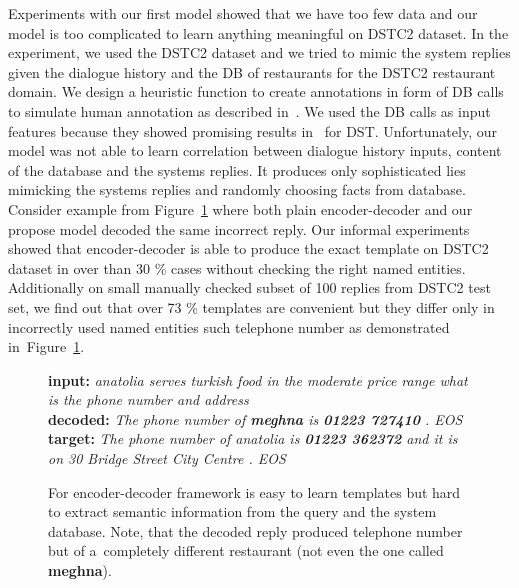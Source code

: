\documentclass[11pt]{article}
\begin{document}
Experiments with our first model showed that we have too few data and our model is too complicated to learn anything meaningful on DSTC2 dataset.
In the experiment, we used the DSTC2 dataset and we tried to mimic the system replies given the dialogue history and the DB of restaurants for the DSTC2 restaurant domain.
We design a heuristic function to create annotations in form of DB calls to simulate human annotation as described in~\cite{platek2016wochat}.
We used the DB calls as input features because they showed promising results in~\cite{platek_recurrent_2016} for DST.
Unfortunately, our model was not able to learn correlation between dialogue history inputs, content of the database and the systems replies.
It produces only sophisticated lies mimicking the systems replies and randomly choosing facts from database.
Consider example from Figure~\ref{fig:encdec_lies} where both plain encoder-decoder and our propose model decoded the same incorrect reply.
Our informal experiments showed that encoder-decoder is able to produce the exact template on DSTC2 dataset in over than 30 \% cases without checking the right named entities.
Additionally on small manually checked subset of 100 replies from DSTC2 test set, we find out that over 73 \% templates are convenient but they differ only in incorrectly used named entities such telephone number as demonstrated in~Figure~\ref{fig:encdec_lies}.
\begin{figure}[!ht]
    {\bf input:} {\it anatolia serves turkish food in the moderate price range what is the phone number and address} \\
    {\bf decoded:} {\it The phone number of {\bf meghna} is {\bf 01223 727410} . EOS} \\
    {\bf target:} {\it The phone number of anatolia is {\bf 01223 362372} and it is on 30 Bridge Street City Centre . EOS } \\
    \caption{For encoder-decoder framework is easy to learn templates but hard to extract semantic information from the query and the system database. Note, that the decoded reply produced telephone number but of a~completely different restaurant (not even the one called {\bf meghna}).}
\label{fig:encdec_lies}
\end{figure}
\end{document}

